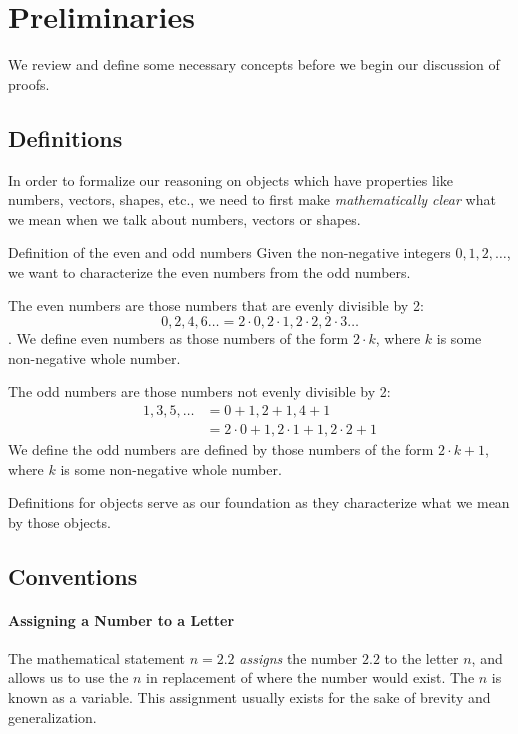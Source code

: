 \documentclass[../proofs.tex]{subfiles}
\begin{document}
\chapter{Preliminaries}
We review and define some necessary concepts before we begin our discussion of
proofs.

\section{Definitions}
In order to formalize our reasoning on objects which have properties like
numbers, vectors, shapes, etc., we need to first make \emph{mathematically
clear} what we mean when we talk about numbers, vectors or shapes.

\begin{expl}{Definition of the even and odd numbers}
  Given the non-negative integers $0, 1, 2, \ldots$, we want to characterize
  the even numbers from the odd numbers.

  The even numbers are those numbers that are evenly divisible by 2:
  $$0, 2, 4, 6 \ldots = 2 \cdot 0, 2 \cdot 1, 2 \cdot 2, 2 \cdot 3 \ldots$$.
  We define even numbers as those numbers of the form $2 \cdot k$, where $k$
  is some non-negative whole number.


  The odd numbers are those numbers not evenly divisible by 2:
  \begin{align*}
    1, 3, 5, \ldots &= 0 + 1, 2 + 1, 4 + 1 \\
                    &= 2 \cdot 0 + 1, 2 \cdot 1 + 1, 2 \cdot 2 + 1
  \end{align*}
  We define the odd numbers are defined by those numbers of the form
  $2 \cdot k + 1$, where $k$ is some non-negative whole number.
\end{expl}

 Definitions for objects serve as our foundation as they characterize what we
 mean by those objects.


\section{Conventions}
  \subsubsection{Assigning a Number to a Letter}
  The mathematical statement $n = 2.2$ \emph{assigns} the number $2.2$ to the
  letter $n$, and allows us to use the $n$ in replacement of where the number
  would exist. The $n$ is known as a variable. This assignment usually exists
  for the sake of brevity and generalization.
\end{document}
